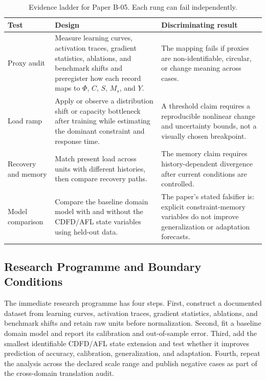 \documentclass[12pt,a4paper]{article}
\begin{document}
\begin{table}[htbp]
\centering
\small
\caption{Evidence ladder for Paper B-05. Each rung can fail independently.}
\begin{tabularx}{\textwidth}{|p{}|X|X|}
\hline
\textbf{Test} & \textbf{Design} & \textbf{Discriminating result} \\
\hline
Proxy audit & Measure learning curves, activation traces, gradient statistics, ablations, and benchmark shifts and preregister how each record maps to $\Phi$, $C$, $S$, $M_s$, and $Y$. & The mapping fails if proxies are non-identifiable, circular, or change meaning across cases. \\
\hline
Load ramp & Apply or observe a distribution shift or capacity bottleneck after training while estimating the dominant constraint and response time. & A threshold claim requires a reproducible nonlinear change and uncertainty bounds, not a visually chosen breakpoint. \\
\hline
Recovery and memory & Match present load across units with different histories, then compare recovery paths. & The memory claim requires history-dependent divergence after current conditions are controlled. \\
\hline
Model comparison & Compare the baseline domain model with and without the CDFD/AFL state variables using held-out data. & The paper's stated falsifier is: explicit constraint-memory variables do not improve generalization or adaptation forecasts. \\
\hline
\end{tabularx}
\end{table}

\subsection{Research Programme and Boundary Conditions}

The immediate research programme has four steps. First, construct a documented
dataset from learning curves, activation traces, gradient statistics, ablations, and benchmark shifts and retain raw units before normalization.
Second, fit a baseline domain model and report its calibration and out-of-sample
error. Third, add the smallest identifiable CDFD/AFL state extension and test
whether it improves prediction of accuracy, calibration, generalization, and adaptation. Fourth, repeat the
analysis across the declared scale range and publish negative cases as part of
the cross-domain translation audit.
\end{document}
